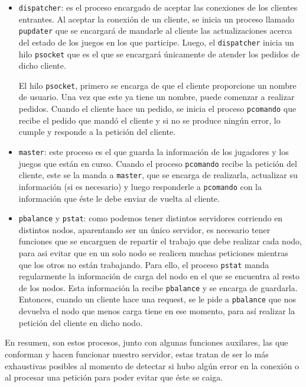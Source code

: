 \documentclass[11pt]{article}
\begin{document}
\begin{itemize}
    \item \texttt{dispatcher}: es el proceso encargado de aceptar las conexiones de los clientes
          entrantes. Al aceptar la conexión de un cliente, se inicia un proceso llamado
          \texttt{pupdater} que se encargará de mandarle al cliente las actualizaciones acerca del
          estado de los juegos en los que participe. Luego, el \texttt{dispatcher} inicia
          un hilo \texttt{psocket} que es el que se encargará únicamente de atender los pedidos de dicho
          cliente.

          \hspace{0.5cm} El hilo \texttt{psocket}, primero se encarga de que el cliente proporcione un 
          nombre de usuario. Una vez que este ya tiene un nombre, puede comenzar a realizar
          pedidos. Cuando el cliente hace un pedido, se inicia el proceso \texttt{pcomando}
          que recibe el pedido que mandó el cliente y si no se produce ningún error, lo cumple
          y responde a la petición del cliente. 
    \item \texttt{master}: este proceso es el que guarda la información de los jugadores y 
          los juegos que están en curso. Cuando el proceso \texttt{pcomando} recibe la
          petición del cliente, este se la manda a \texttt{master}, que se encarga de 
          realizarla, actualizar su información (si es necesario) y luego responderle a \texttt{pcomando} con la información que éste
          le debe enviar de vuelta al cliente.
    \item \texttt{pbalance} y \texttt{pstat}: como podemos tener distintos servidores corriendo
          en distintos nodos, aparentando ser un único servidor, es necesario tener funciones
          que se encarguen de repartir el trabajo que debe realizar cada nodo, para asi evitar 
          que en un solo nodo se realicen muchas peticiones mientras que los otros no están trabajando.
          Para ello, el proceso \texttt{pstat} manda regularmente la información de carga del nodo en el que
          se encuentra al resto de los nodos. Esta información la recibe \texttt{pbalance} y se encarga de
          guardarla. Entonces, cuando un cliente hace una request, se le pide a \texttt{pbalance} que
          nos devuelva el nodo que menos carga tiene en ese momento, para así realizar la petición del 
          cliente en dicho nodo. 
\end{itemize}

En resumen, son estos procesos, junto con algunas funciones auxilares, las que conforman
y hacen funcionar nuestro servidor, estas tratan de ser lo más exhaustivas posibles al
momento de detectar si hubo algún error en la conexión o al procesar una petición para poder
evitar que éste se caiga.
\end{document}
